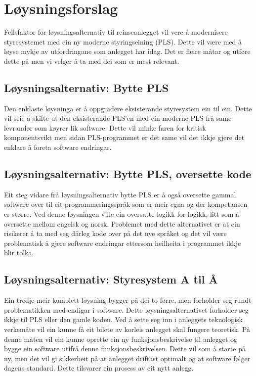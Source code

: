 
\section{Løysningsforslag}
Fellsfaktor for løysningsalternativ til reinseanlegget vil vere å modernisere 
styresystemet med ein ny moderne styringseining (PLS). 
Dette vil være med å løyse mykje av utfordringane som anlegget har idag. 
Det er fleire måtar og utføre dette på men vi velger å ta med dei som er mest relevant.
\newpage


\subsection{Løysningsalternativ: Bytte PLS}
Den enklaste løysninga er å oppgradere eksisterande styresystem ein til ein. 
Dette vil seie å skifte ut den eksisterande PLS'en med ein moderne PLS frå same levrandør som køyrer lik software.
Dette vil minke faren for kritisk komponentsvikt men sidan PLS-programmet er det same vil det ikkje gjere det enklare å foreta
software endringar.

\subsection{Løysningsalternativ: Bytte PLS, oversette kode}
Eit steg vidare frå løysningsalternativ bytte PLS er å også oversette gammal software over til eit programmeringsspråk
som er meir egna og der kompetansen er større. Ved denne løysningen ville ein oversatte logikk for logikk, litt som å
oversette mellom engelsk og norsk.\newline
Problemet med dette alternativet er at ein risikerer å ta med seg dårleg kode over på det nye språket og
det vil være problematisk å gjere software endringar ettersom heilheita i programmet ikkje blir tolka.

\subsection{Løysningsalternativ: Styresystem A til Å}
Ein tredje meir komplett løysning bygger på dei to førre, men forholder seg rundt problematikken med endigar i software.
Dette løysningsalternativet forholder seg ikkje til PLS eller den gamle koden.\newline
Ved å sette seg inn i anleggets teknologisk verkemåte vil ein kunne få eit bilete av korleis anlegget skal fungere teoretisk.
På denne måten vil ein kunne oprette ein ny funksjonsbeskrivelse til anlegget og bygge ein software utifrå denne funksjonsbeskrivelsen.
Dette vil som å starte på ny, men det vil gi sikkerheit på at anlegget driftast optimalt og at software følger
dagens standard. Dette tilsvarer ein prosess av eit nytt anlegg.

